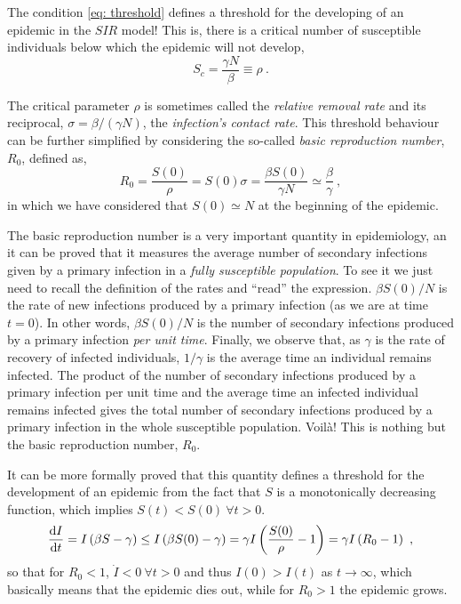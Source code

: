 The condition \cref{eq: threshold} defines a threshold for the developing of an
epidemic in the $SIR$ model! This is, there is a critical number of susceptible
individuals below which the epidemic will not develop,
\begin{equation}
  S_c=\frac{\gamma N}{\beta}\equiv \rho \ .
\end{equation}

The critical parameter $\rho$ is sometimes called the \textit{relative removal
  rate} and its reciprocal, $\sigma=\beta/(\gamma N)$, the \textit{infection’s
  contact rate}. This threshold behaviour can be further simplified by
considering the so-called \textit{basic reproduction number}, $R_0$, defined
as,
\begin{equation}
  R_0=\frac{S(0)}{\rho}=S(0)\sigma=\frac{\beta S(0)}{\gamma
    N}\simeq\frac{\beta}{\gamma} \ ,
\end{equation}
in which we have considered that $S(0)\simeq N$ at the beginning of the
epidemic.

The basic reproduction number is a very important quantity in
epidemiology, an it can be proved that it measures the average number of
secondary infections given by a primary infection in a \textit{fully
  susceptible population}. To see it we just need to recall the definition of
the rates and ``read'' the expression. $\beta S(0)/N$ is the rate of new
infections produced by a primary infection (as we are at time $t=0$). In other
words, $\beta	S(0)/N$ is the number of secondary infections produced by a
primary infection \textit{per unit time}. Finally, we observe that, as $\gamma$
is the rate of recovery of infected individuals, $1/\gamma$ is the average time
an individual remains infected. The product of the number of secondary
infections produced by a primary infection per unit time and the average time
an infected individual remains infected gives the total number of secondary
infections produced by a primary infection in the whole susceptible population.
Voilà! This is nothing but the basic reproduction number, $R_0$.

It can be more formally proved that this quantity defines a threshold for the
development of an epidemic from the fact that $S$ is a monotonically decreasing
function, which implies $S(t)<S(0) \ \forall t>0$.
\begin{equation}\label{eq: threshold_t}
  \frac{\mathrm{d} I}{\mathrm{d} t}=I\left(\beta S-\gamma\right)\leq I\left(\beta
    S(0)-\gamma\right)=\gamma I\left(\frac{S(0)}{\rho}-1\right)=\gamma
  I\left(R_0-1\right) \
  ,
\end{equation}
so that for $R_0<1$, $\dot{I}<0 \ \forall t>0$ and thus $I(0)>I(t)$ as
$t\to\infty$, which basically means that the epidemic dies out, while for
$R_0>1$ the epidemic grows.

